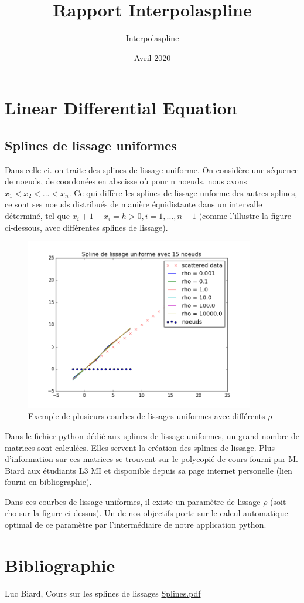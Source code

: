 \documentclass[a4paper,12pt]{article} %
\title{Rapport Interpolaspline}
\author{Interpolaspline}
\date{Avril 2020}
\begin{document}
 \maketitle

\section{Linear Differential Equation}

\subsection{Splines de lissage uniformes}

Dans celle-ci. on traite des splines de lissage uniforme.
On considère une séquence de noeuds,  de coordonées en abscisse où pour n noeuds, nous avons $x_1 < x_2 < ... < x_n$. Ce qui diffère les splines de lissage unforme des autres splines, ce sont ses noeuds distribués de manière équidistante dans un intervalle déterminé, tel que $x_i+1 - x_i = h > 0, i = 1,...,n-1$ (comme l'illustre la figure ci-dessous, avec différentes splines de lissage).

\begin{figure}[htp]
    \centering
    \includegraphics[width=10cm]{IMG_Tache1}
    \caption{Exemple de plusieurs courbes de lissages uniformes avec différents  $\rho$  }
    \label{fig:uniforme}
\end{figure}

Dans le fichier python dédié aux splines de lissage uniformes, un grand nombre de matrices sont calculées. Elles servent la création des splines de lissage. Plus d'information sur ces matrices se trouvent sur le polycopié de cours fourni par M. Biard aux étudiants L3 MI et disponible depuis sa page internet personelle (lien fourni en bibliographie).


Dans ces courbes de lissage uniformes, il existe un paramètre de lissage $\rho$ (soit rho sur la figure ci-dessus). Un de nos objectifs porte sur le calcul automatique optimal de ce paramètre par l'intermédiaire de notre application python.



\section{Bibliographie}
Luc Biard, Cours sur les splines de lissages
\href{http://www-ljk.imag.fr/membres/Luc.Biard/L3MI_cours/Splines.pdf}{Splines.pdf}
     
\end{document}
